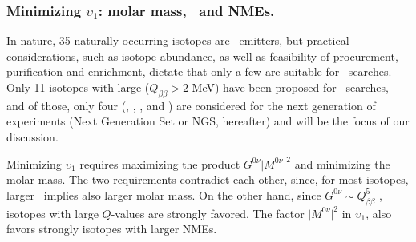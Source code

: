 

\subsubsection{Minimizing $\upsilon_1$: molar mass, \Qbb\ and NMEs.} \label{subsec:isotope}
In nature, 35 naturally-occurring isotopes are \bb\ emitters, but practical considerations, such as isotope abundance, as well as feasibility of procurement,   purification and enrichment, dictate that only a few are suitable for \bbonu\ searches. Only 11 isotopes with large \Qbb ($Q_{\beta\beta}>2$ MeV)  have been proposed for \bbonu\ searches, and of those, only four (, , , and ) are considered for the next generation of experiments (Next Generation Set or NGS, hereafter) and will be the focus of our discussion. 

Minimizing $\upsilon_1$ requires maximizing the product $G^{0\nu}\lvert M^{0\nu}\rvert^2$ and minimizing the molar mass. The two requirements contradict each other, since, for most isotopes, larger \Qbb\ implies also larger molar mass. On the other hand, since $G^{0\nu} \sim Q_{\beta\beta}^5$ \cite{Vogel:2008sx}, isotopes with large $Q$-values are strongly favored. The factor $\lvert M^{0\nu}\rvert^2$ in $\upsilon_1$, also favors strongly isotopes with larger NMEs. 


%
%

